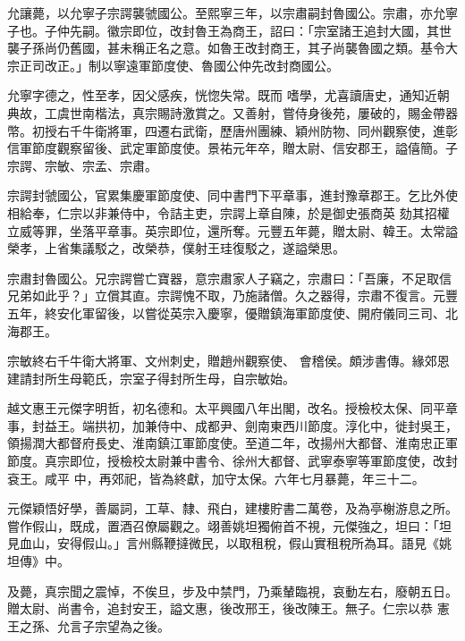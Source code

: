 \begin{pinyinscope}
 允讓薨，以允寧子宗諤襲虢國公。至熙寧三年，以宗肅嗣封魯國公。宗肅，亦允寧子也。子仲先嗣。徽宗即位，改封魯王為商王，詔曰：「宗室諸王追封大國，其世襲子孫尚仍舊國，甚未稱正名之意。如魯王改封商王，其子尚襲魯國之類。基令大宗正司改正。」制以寧遠軍節度使、魯國公仲先改封商國公。



 允寧字德之，性至孝，因父感疾，恍惚失常。既而
 嗜學，尤喜讀唐史，通知近朝典故，工虞世南楷法，真宗賜詩激賞之。又善射，嘗侍身後苑，屢破的，賜金帶器幣。初授右千牛衛將軍，四遷右武衛，歷唐州團練、穎州防物、同州觀察使，進彰信軍節度觀察留後、武定軍節度使。景祐元年卒，贈太尉、信安郡王，謚僖簡。子宗諤、宗敏、宗孟、宗肅。



 宗諤封虢國公，官累集慶軍節度使、同中書門下平章事，進封豫章郡王。乞比外使相給奉，仁宗以非兼侍中，令詰主吏，宗諤上章自陳，於是御史張商英
 劾其招權立威等罪，坐落平章事。英宗即位，還所奪。元豐五年薨，贈太尉、韓王。太常謚榮孝，上省集議駁之，改榮恭，僕射王珪復駁之，遂謚榮思。



 宗肅封魯國公。兄宗諤嘗亡寶器，意宗肅家人子竊之，宗肅曰：「吾廉，不足取信兄弟如此乎？」立償其直。宗諤愧不取，乃施諸僧。久之器得，宗肅不復言。元豐五年，終安化軍留後，以嘗從英宗入慶寧，優贈鎮海軍節度使、開府儀同三司、北海郡王。



 宗敏終右千牛衛大將軍、文州刺史，贈趙州觀察使、
 會稽侯。頗涉書傳。緣郊恩建請封所生母範氏，宗室子得封所生母，自宗敏始。



 越文惠王元傑字明哲，初名德和。太平興國八年出閣，改名。授檢校太保、同平章事，封益王。端拱初，加兼侍中、成都尹、劍南東西川節度。淳化中，徙封吳王，領揚潤大都督府長史、淮南鎮江軍節度使。至道二年，改揚州大都督、淮南忠正軍節度。真宗即位，授檢校太尉兼中書令、徐州大都督、武寧泰寧等軍節度使，改封袞王。咸平
 中，再郊祀，皆為終獻，加守太保。六年七月暴薨，年三十二。



 元傑穎悟好學，善屬詞，工草、隸、飛白，建樓貯書二萬卷，及為亭榭游息之所。嘗作假山，既成，置酒召僚屬觀之。翊善姚坦獨俯首不視，元傑強之，坦曰：「坦見血山，安得假山。」言州縣鞭撻微民，以取租稅，假山實租稅所為耳。語見《姚坦傳》中。



 及薨，真宗聞之震悼，不俟旦，步及中禁門，乃乘輦臨視，哀動左右，廢朝五日。贈太尉、尚書令，追封安王，謚文惠，後改邢王，後改陳王。無子。仁宗以恭
 憲王之孫、允言子宗望為之後。




\end{pinyinscope}
